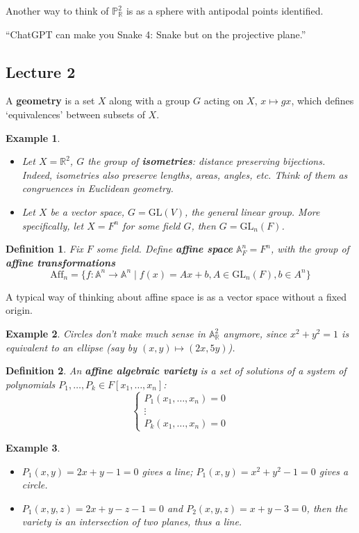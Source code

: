 \documentclass[12pt]{article}
\newcommand{\R}{\mathbb{R}}
\renewcommand{\P}{\mathbb{P}}
\newcommand{\GL}{\mathrm{GL}}
\newcommand{\A}{\mathbb{A}}
\newtheorem{definition}{Definition}[section]
\newtheorem*{example}{Example}
\begin{document}
        Another way to think of $\P_\R^2$ is as a sphere with antipodal points identified. \par
        ``ChatGPT can make you Snake 4: Snake but on the projective plane.''
        
    \subsection{Lecture 2} 
    A \textbf{geometry} is a set $X$ along with a group $G$ acting on $X$, $x \mapsto gx$, which defines `equivalences' between subsets of $X$. 
    \begin{example}
        \begin{itemize}
            \item Let $X = \R^2$, $G$ the group of \textbf{isometries}: distance preserving bijections. Indeed, isometries also preserve lengths, areas, angles, etc. Think of them as congruences in Euclidean geometry. 
            \item Let $X$ be a vector space, $G = \text{GL}(V)$, the general linear group. More specifically, let $X = F^n$ for some field $G$, then $G = \GL_n(F)$.  
        \end{itemize}
    \end{example}
    \begin{definition}
        Fix $F$ some field. Define \textbf{affine space} $\A_F^n = F^n$, with the group of \textbf{affine transformations} $$\mathrm{Aff}_n = \{f: \A^n \to \A^n \mid f(x) = Ax + b, A \in \GL_n(F), b \in A^n\}$$
    \end{definition}
    A typical way of thinking about affine space is as a vector space without a fixed origin. 
    \begin{example}
        Circles don't make much sense in $\A_\R^2$ anymore, since $x^2 + y^2 = 1$ is equivalent to an ellipse (say by $(x, y) \mapsto (2x, 5y)$). 
    \end{example}
    \begin{definition}
        An \textbf{affine algebraic variety} is a set of solutions of a system of polynomials $P_1, \dots, P_k \in F[x_1, \dots, x_n]$:
        $$\begin{cases}
            P_1(x_1, \dots, x_n) = 0 \\
            \vdots \\
            P_k(x_1, \dots, x_n) = 0
        \end{cases}$$
    \end{definition}
    \begin{example}
        \begin{itemize}
            \item $P_1(x, y) = 2x + y - 1 = 0$ gives a line; $P_1(x, y) = x^2 + y^2 - 1 = 0$ gives a circle.
            \item $P_1(x, y, z) = 2x+y-z-1 = 0$ and $P_2(x, y, z) = x + y -3 = 0$, then the variety is an intersection of two planes, thus a line.  
        \end{itemize}
    \end{example}
\end{document}

